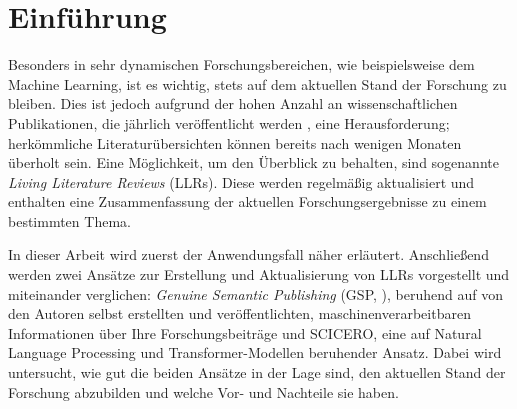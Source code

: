 \section{Einführung}
\label{sec:einfuehrung}

Besonders in sehr dynamischen Forschungsbereichen, wie beispielsweise dem Machine Learning, ist es wichtig, stets auf dem aktuellen Stand der Forschung zu bleiben.
Dies ist jedoch aufgrund der hohen Anzahl an wissenschaftlichen Publikationen, die jährlich veröffentlicht werden \cite{scientific-growth}, eine Herausforderung; herkömmliche Literaturübersichten können bereits nach wenigen Monaten überholt sein.
Eine Möglichkeit, um den Überblick zu behalten, sind sogenannte \textit{Living Literature Reviews} (LLRs).
Diese werden regelmäßig aktualisiert und enthalten eine Zusammenfassung der aktuellen Forschungsergebnisse zu einem bestimmten Thema.

In dieser Arbeit wird zuerst der Anwendungsfall näher erläutert.
Anschließend werden zwei Ansätze zur Erstellung und Aktualisierung von LLRs vorgestellt und miteinander verglichen:
\textit{Genuine Semantic Publishing} (GSP, \cite{kuhn2017genuine}), beruhend auf von den Autoren selbst erstellten und veröffentlichten, maschinenverarbeitbaren Informationen über Ihre Forschungsbeiträge und SCICERO, eine auf Natural Language Processing und Transformer-Modellen beruhender Ansatz.
Dabei wird untersucht, wie gut die beiden Ansätze in der Lage sind, den aktuellen Stand der Forschung abzubilden und welche Vor- und Nachteile sie haben.
